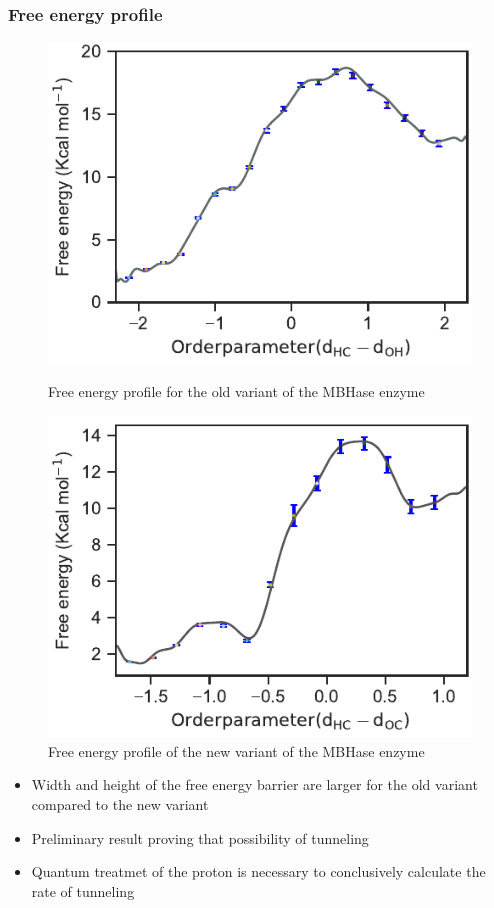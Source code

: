 \documentclass{beamer}
\begin{document}
\begin{frame}
\frametitle{Free energy profile}
\begin{figure}
\centering
\begin{minipage}[b]{0.45\linewidth}
\includegraphics[scale=0.6]{figures/glu-fenergy.pdf}
\caption{Free energy profile for the old variant of the MBHase enzyme}
\label{fig:minipagef1}
\end{minipage}
\quad
\begin{minipage}[b]{0.45\linewidth}
\includegraphics[scale=0.6]{figures/prot-alkox-fenergy.pdf}
\caption{Free energy profile of the new variant of the MBHase enzyme}
\end{minipage}
\end{figure}
\begin{block}{}
\begin{itemize}
\item Width and height of the free energy barrier are larger for the old variant compared
to the new variant
\item Preliminary result proving that possibility of tunneling 
\item Quantum treatmet of the proton is necessary to conclusively calculate 
the rate of tunneling
\end{itemize}
\end{block}
\end{frame}
\end{document}
